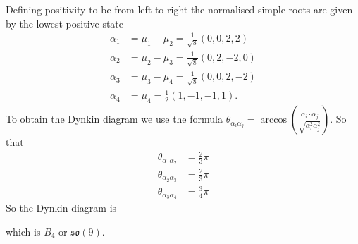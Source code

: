 \documentclass[main.tex]{subfiles}
\begin{document}
Defining positivity to be from left to right the normalised simple roots are given by the lowest positive state
\begin{align}
\alpha_1&=\mu_1-\mu_2=\frac{1}{\sqrt{8}}(0,0,2,2)\\
\alpha_2&=\mu_2-\mu_3=\frac{1}{\sqrt{8}}(0,2,-2,0)\\
\alpha_3&=\mu_3-\mu_4=\frac{1}{\sqrt{8}}(0,0,2,-2)\\
\alpha_4&=\mu_4=\frac{1}{2}(1,-1,-1,1).
\end{align}
To obtain the Dynkin diagram we use the formula $\theta_{\alpha_i\alpha_j}=\arccos{\left(\frac{\alpha_i\cdot\alpha_j}{\sqrt{\alpha_i^2\alpha_j^2}}\right)}$. So that
\begin{align}
\theta_{\alpha_1\alpha_2}&=\frac{2}{3}\pi\\
\theta_{\alpha_2\alpha_3}&=\frac{2}{3}\pi\\
\theta_{\alpha_3\alpha_4}&=\frac{3}{4}\pi
\end{align}
So the Dynkin diagram is 
\begin{figure}[H] 
\centering
\end{figure}
which is $B_4$ or $\mathfrak{so}(9)$.
\end{document}
